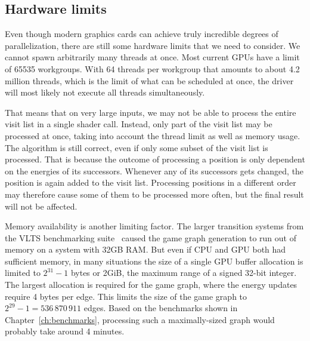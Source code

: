 \subsection{Hardware limits}\label{subsec:hw_limits}

Even though modern graphics cards can achieve truly incredible degrees of
parallelization,
there are still some hardware limits that we need to consider.
We cannot spawn arbitrarily many threads at once.
Most current GPUs have a limit of 65535 workgroups.
With 64 threads per workgroup that amounts to about 4.2 million threads,
which is the limit of what can be scheduled at once, the driver will most
likely not execute all threads simultaneously.

That means that on very large inputs,
we may not be able to process the entire visit list in a single shader call.
Instead, only part of the visit list may be processed at once,
taking into account the thread limit as well as memory usage.
The algorithm is still correct,
even if only some subset of the visit list is processed.
That is because the outcome of processing a position is only dependent
on the energies of its successors.
Whenever any of its successors gets changed,
the position is again added to the visit list.
Processing positions in a different order may therefore cause some of them
to be processed more often,
but the final result will not be affected.

Memory availability is another limiting factor.
The larger transition systems from the VLTS benchmarking suite~\cite{vlts}
caused the game graph generation to run out of memory
on a system with 32GB RAM\@.
But even if CPU and GPU both had sufficient memory,
in many situations the size of a single GPU buffer allocation
is limited to $2^{31} - 1$ bytes or 2GiB,
the maximum range of a signed 32-bit integer.
The largest allocation is required for the game graph,
where the energy updates require 4 bytes per edge.
This limits the size of the game graph to
$2^{29} - 1 = 536\,870\,911$ edges.
Based on the benchmarks shown in Chapter~\ref{ch:benchmarks},
processing such a maximally-sized graph would probably take around 4 minutes.
